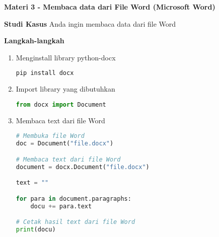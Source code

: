 \documentclass{article}
\begin{document}
    \begin{flushleft}
        \textbf{Materi 3 - Membaca data dari File Word (Microsoft Word)}
        \newline

        \textbf{Studi Kasus}
        \newline
        Anda ingin membaca data dari file Word
        \newline

        \textbf{Langkah-langkah}

        \begin{enumerate}
            \item Menginstall library python-docx
            \lstset{style=bashstyle}
            \begin{lstlisting}[language=bash]
pip install docx
            \end{lstlisting}

            \item Import library yang dibutuhkan
            \lstset{style=pythonstyle}
            \begin{lstlisting}[language=python]
from docx import Document
            \end{lstlisting}

            \item Membaca text dari file Word
            \lstset{style=pythonstyle}
            \begin{lstlisting}[language=python]
# Membuka file Word
doc = Document("file.docx")

# Membaca text dari file Word
document = docx.Document("file.docx")

text = ""

for para in document.paragraphs:
    docu += para.text

# Cetak hasil text dari file Word
print(docu)
            \end{lstlisting}

        \end{enumerate}
    \end{flushleft}
\end{document}
